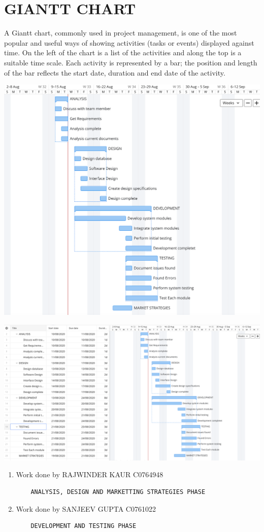 \section* {GIANTT CHART}
A Giantt chart, commonly used in project management, is one of the most popular and useful ways of showing activities (tasks or events) displayed against time. On the left of the chart is a list of the activities and along the top is a suitable time scale. Each activity is represented by a bar; the position and length of the bar reflects the start date, duration and end date of the activity.

\begin{center}
\includegraphics[scale=0.55]{GIANTT.png}\\[0.75cm]
\end{center}

\begin{center}
\includegraphics[scale=0.3]{CHART.png}\\[0.75cm]
\end{center}

\begin{enumerate}
    \item Work done by RAJWINDER KAUR C0764948
    \begin{verbatim}
    ANALYSIS, DESIGN AND MARKETTING STRATEGIES PHASE
    \end{verbatim}
    \item Work done by SANJEEV GUPTA C0761022
    \begin{verbatim}
    DEVELOPMENT AND TESTING PHASE
    \end{verbatim}
\end{enumerate}
